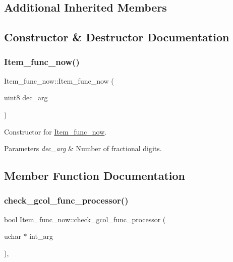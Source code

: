 \subsection*{Additional Inherited Members}


\subsection{Constructor \& Destructor Documentation}
\mbox{\label{classItem__func__now_a3c9d2a5520c09009462186c61a20b1d2}} 
\subsubsection{\texorpdfstring{Item\+\_\+func\+\_\+now()}{Item\_func\_now()}}
{\footnotesize\ttfamily Item\+\_\+func\+\_\+now\+::\+Item\+\_\+func\+\_\+now (\begin{DoxyParamCaption}\item[{uint8}]{dec\+\_\+arg }\end{DoxyParamCaption})\hspace{0.3cm}{\ttfamily [inline]}}

Constructor for \mbox{\hyperlink{classItem__func__now}{Item\+\_\+func\+\_\+now}}. 
\begin{DoxyParams}{Parameters}
{\em dec\+\_\+arg} & Number of fractional digits. \\
\hline
\end{DoxyParams}


\subsection{Member Function Documentation}
\mbox{\label{classItem__func__now_a724c78088a5de2c85cab8d92f0f8a519}} 
\subsubsection{\texorpdfstring{check\+\_\+gcol\+\_\+func\+\_\+processor()}{check\_gcol\_func\_processor()}}
{\footnotesize\ttfamily bool Item\+\_\+func\+\_\+now\+::check\+\_\+gcol\+\_\+func\+\_\+processor (\begin{DoxyParamCaption}\item[{uchar $\ast$}]{int\+\_\+arg }\end{DoxyParamCaption})\hspace{0.3cm}{\ttfamily [inline]}, {\ttfamily [virtual]}}

